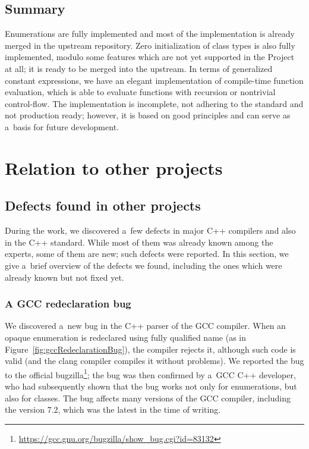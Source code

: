 \documentclass[nolot,nolof,nocover,printed]{fithesis3}
\begin{document}

\section{Summary}

Enumerations are fully implemented and most of the implementation is already merged in the upstream repository. Zero initialization of class types is also fully implemented, modulo some features which are not yet supported in the Project at all; it is ready to be merged into the upstream. In terms of generalized constant expressions, we have an elegant implementation of compile-time function evaluation, which is able to evaluate functions with recursion or nontrivial control-flow. The implementation is incomplete, not adhering to the standard and not production ready; however, it is based on good principles and can serve as a~basis for future development.

\chapter{Relation to other projects}\label{chap:contribToOtherProjects}


\section{Defects found in other projects}\label{sec:defects}
During the work, we discovered a~few defects in major C++ compilers and also in the C++ standard. While most of them was already known among the experts, some of them are new; such defects were reported.
In this section, we give a~brief overview of the defects we found, including the ones which were already known but not fixed yet.

\subsection{A GCC redeclaration bug}
We discovered a~new bug in the C++ parser of the GCC compiler. When an opaque enumeration is redeclared using fully qualified name (as in Figure~\ref{fig:gccRedeclarationBug}), the compiler rejects it, although such code is valid (and the clang compiler compiles it without problems).
We reported the bug to the official bugzilla\footnote{\url{https://gcc.gnu.org/bugzilla/show_bug.cgi?id=83132}}; the bug was then confirmed by a~GCC C++ developer, who had subsequently shown that the bug works not only for enumerations, but also for classes. The bug affects many versions of the GCC compiler, including the version 7.2, which was the latest in the time of writing.
\end{document}
